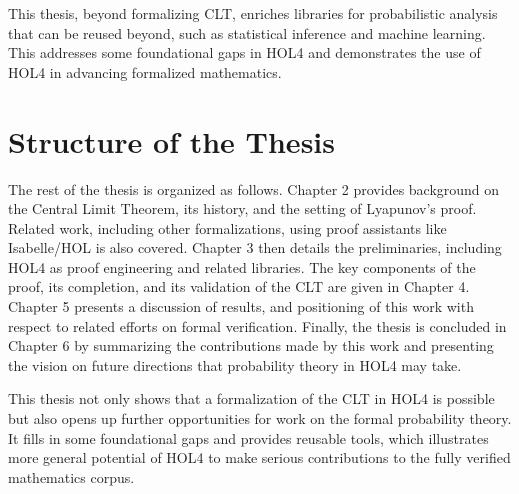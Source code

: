 This thesis, beyond formalizing CLT, enriches libraries for probabilistic analysis that can be reused beyond, such as statistical inference and machine learning. This addresses some foundational gaps in HOL4 and demonstrates the use of HOL4 in advancing formalized mathematics.

\section{Structure of the Thesis}
The rest of the thesis is organized as follows. Chapter 2 provides background on the Central Limit Theorem, its history, and the setting of Lyapunov's proof. Related work, including other formalizations, using proof assistants like Isabelle/HOL is also covered. Chapter 3 then details the preliminaries, including HOL4 as proof engineering and related libraries. The key components of the proof, its completion, and its validation of the CLT are given in Chapter 4. Chapter 5 presents a discussion of results, and positioning of this work with respect to related efforts on formal verification. Finally, the thesis is concluded in Chapter 6 by summarizing the contributions made by this work and presenting the vision on future directions that probability theory in HOL4 may take.

This thesis not only shows that a formalization of the CLT in HOL4 is possible but also opens up further opportunities for work on the formal probability theory. It fills in some foundational gaps and provides reusable tools, which illustrates more general potential of HOL4 to make serious contributions to the fully verified mathematics corpus.